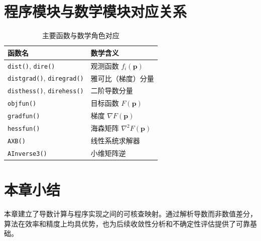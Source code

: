 \section{程序模块与数学模块对应关系}
\begin{table}[H]
\centering
\caption{主要函数与数学角色对应}
\begin{tabular}{ll}
\toprule
函数名 & 数学含义 \\
\midrule
\texttt{dist()}, \texttt{dire()} & 观测函数 $f_i(\bm p)$ \\
\texttt{distgrad()}, \texttt{diregrad()} & 雅可比（梯度）分量 \\
\texttt{disthess()}, \texttt{direhess()} & 二阶导数分量 \\
\texttt{objfun()} & 目标函数 $F(\bm p)$ \\
\texttt{gradfun()} & 梯度 $\nabla F(\bm p)$ \\
\texttt{hessfun()} & 海森矩阵 $\nabla^2F(\bm p)$ \\
\texttt{AXB()} & 线性系统求解器 \\
\texttt{AInverse3()} & 小维矩阵逆 \\
\bottomrule
\end{tabular}
\end{table}

\section{本章小结}
本章建立了导数计算与程序实现之间的可核查映射。通过解析导数而非数值差分，算法在效率和精度上均具优势，也为后续收敛性分析和不确定性评估提供了可靠基础。
